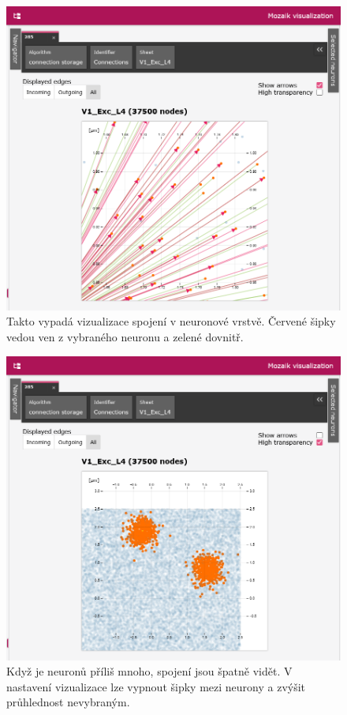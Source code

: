 \begin{figure}
	\centering
	\includegraphics[width=1\linewidth]{img/screenshot_connections.png}
	\caption{Takto vypadá vizualizace spojení v neuronové vrstvě. Červené šipky vedou ven z vybraného neuronu a zelené dovnitř.}
	\label{fig:connections}
\end{figure}

\begin{figure}
	\centering
	\includegraphics[width=1\linewidth]{img/screenshot_connections_dense.png}
	\caption{Když je neuronů příliš mnoho, spojení jsou špatně vidět. V nastavení vizualizace lze vypnout šipky mezi neurony a zvýšit průhlednost nevybraným.}
	\label{fig:connections_dense}
\end{figure}

